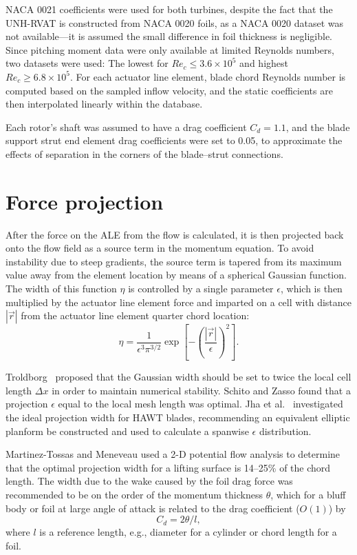\documentclass[times]{weauth}
\begin{document}
NACA 0021 coefficients were used for both turbines, despite the fact that the
UNH-RVAT is constructed from NACA 0020 foils, as a NACA 0020 dataset was not
available---it is assumed the small difference in foil thickness is negligible.
Since pitching moment data were only available at limited Reynolds numbers, two
datasets were used: The lowest for $Re_c \leq 3.6 \times 10^5$ and highest $Re_c
\geq 6.8 \times 10^5$. For each actuator line element, blade chord Reynolds
number is computed based on the sampled inflow velocity, and the static
coefficients are then interpolated linearly within the database.

Each rotor's shaft was assumed to have a drag coefficient $C_d = 1.1$, and the
blade support strut end element drag coefficients were set to 0.05, to
approximate the effects of separation in the corners of the blade--strut
connections.


\section{Force projection}

After the force on the ALE from the flow is calculated, it is then projected
back onto the flow field as a source term in the momentum equation. To avoid
instability due to steep gradients, the source term is tapered from its maximum
value away from the element location by means of a spherical Gaussian function.
The width of this function $\eta$ is controlled by a single parameter
$\epsilon$, which is then multiplied by the actuator line element force and
imparted on a cell with distance $| \vec{r} |$ from the actuator line element
quarter chord location:
\begin{equation}
    \eta = \frac{1}{\epsilon^3 \pi^{3/2}} \exp
    \left[ - \left( \frac{| \vec{r} |}{\epsilon} \right)^2 \right].
    \label{eq:projection}
\end{equation}

Troldborg~\cite{Troldborg2008} proposed that the Gaussian width should be set to
twice the local cell length $\Delta x$ in order to maintain numerical stability.
Schito and Zasso \cite{Schito2014} found that a projection $\epsilon$ equal to
the local mesh length was optimal. Jha et al.~\cite{Jha2014} investigated the
ideal projection width for HAWT blades, recommending an equivalent elliptic
planform be constructed and used to calculate a spanwise $\epsilon$
distribution.

Martinez-Tossas and Meneveau \cite{Martinez-Tossas2015b} used a 2-D potential
flow analysis to determine that the optimal projection width for a lifting
surface is 14--25\% of the chord length. The width due to the wake caused by the
foil drag force was recommended to be on the order of the momentum thickness
$\theta$, which for a bluff body or foil at large angle of attack is related to
the drag coefficient ($O(1)$) by \cite{TennekesAndLumley}
\begin{equation}
    C_d = 2 \theta / l,
    \label{eq:mom-thickness}
\end{equation}
where $l$ is a reference length, e.g., diameter for a cylinder or chord length
for a foil.
\end{document}
